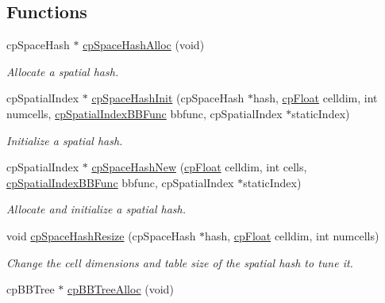 \subsection*{Functions}
\begin{DoxyCompactItemize}
\item 
\hypertarget{group__cp_spatial_index_ga61ba28bd31d8f7e19d331afae0ee76b9}{}cp\+Space\+Hash $\ast$ \hyperlink{group__cp_spatial_index_ga61ba28bd31d8f7e19d331afae0ee76b9}{cp\+Space\+Hash\+Alloc} (void)\label{group__cp_spatial_index_ga61ba28bd31d8f7e19d331afae0ee76b9}

\begin{DoxyCompactList}\small\item\em Allocate a spatial hash. \end{DoxyCompactList}\item 
\hypertarget{group__cp_spatial_index_gac028d5b83798b0a9bbd4d0d29b9f7914}{}cp\+Spatial\+Index $\ast$ \hyperlink{group__cp_spatial_index_gac028d5b83798b0a9bbd4d0d29b9f7914}{cp\+Space\+Hash\+Init} (cp\+Space\+Hash $\ast$hash, \hyperlink{group__basic_types_gac1ed65573e035bf892505768c852d8d3}{cp\+Float} celldim, int numcells, \hyperlink{group__cp_spatial_index_gaa8cf991cadcee1fbb6ee9379a0a6e0ea}{cp\+Spatial\+Index\+B\+B\+Func} bbfunc, cp\+Spatial\+Index $\ast$static\+Index)\label{group__cp_spatial_index_gac028d5b83798b0a9bbd4d0d29b9f7914}

\begin{DoxyCompactList}\small\item\em Initialize a spatial hash. \end{DoxyCompactList}\item 
\hypertarget{group__cp_spatial_index_ga48c6a8a52184403547f5c185c2a758f6}{}cp\+Spatial\+Index $\ast$ \hyperlink{group__cp_spatial_index_ga48c6a8a52184403547f5c185c2a758f6}{cp\+Space\+Hash\+New} (\hyperlink{group__basic_types_gac1ed65573e035bf892505768c852d8d3}{cp\+Float} celldim, int cells, \hyperlink{group__cp_spatial_index_gaa8cf991cadcee1fbb6ee9379a0a6e0ea}{cp\+Spatial\+Index\+B\+B\+Func} bbfunc, cp\+Spatial\+Index $\ast$static\+Index)\label{group__cp_spatial_index_ga48c6a8a52184403547f5c185c2a758f6}

\begin{DoxyCompactList}\small\item\em Allocate and initialize a spatial hash. \end{DoxyCompactList}\item 
void \hyperlink{group__cp_spatial_index_ga71489134c15a3bcb1efb0913e765a3c1}{cp\+Space\+Hash\+Resize} (cp\+Space\+Hash $\ast$hash, \hyperlink{group__basic_types_gac1ed65573e035bf892505768c852d8d3}{cp\+Float} celldim, int numcells)
\begin{DoxyCompactList}\small\item\em Change the cell dimensions and table size of the spatial hash to tune it. \end{DoxyCompactList}\item 
\hypertarget{group__cp_spatial_index_ga415b605cbf6dc64a6f519923bb14e223}{}cp\+B\+B\+Tree $\ast$ \hyperlink{group__cp_spatial_index_ga415b605cbf6dc64a6f519923bb14e223}{cp\+B\+B\+Tree\+Alloc} (void)\label{group__cp_spatial_index_ga415b605cbf6dc64a6f519923bb14e223}


\end{DoxyCompactItemize}

